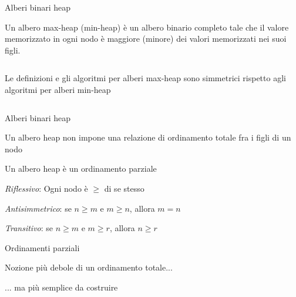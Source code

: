 \begin{frame}{Alberi binari heap}

\vspace{-9pt}
\begin{myboxtitle}
Un \alert{albero max-heap} (\alert{min-heap}) è un albero binario 
completo tale che il valore memorizzato in ogni nodo è \alert{maggiore} (\alert{minore}) dei valori memorizzati nei suoi figli.
\end{myboxtitle}

\vspace{-6pt}
\begin{columns}[T]

\begin{myboxtitle}[Note]
Le definizioni e gli algoritmi per alberi max-heap sono simmetrici rispetto
agli algoritmi per alberi min-heap
\end{myboxtitle}

\vspace{-6pt}
\end{columns}

\end{frame}

\begin{frame}{Alberi binari heap}

\BIL
\item Un albero heap non impone una relazione di ordinamento totale fra i figli di un nodo
\item Un albero heap è un \alert{ordinamento parziale}
  \BI
  \item \emph{Riflessivo}: Ogni nodo è $\geq$ di se stesso
  \item \emph{Antisimmetrico}: se $n \geq m$ e $m \geq n$, allora $m=n$
  \item \emph{Transitivo}: se $n \geq m$ e $m \geq r$, allora $n \geq r$
  \EI
\item Ordinamenti parziali
  \BI
  \item Nozione più debole di un ordinamento totale...
  \item ... ma più semplice da costruire
  \EI
\EIL

\end{frame}


